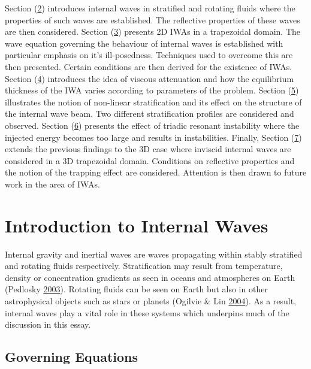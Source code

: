 \documentclass[a4paper]{article}
\numberwithin{equation}{section}
\begin{document}
Section (\hyperref[sec:2]{2}) introduces internal waves in stratified and rotating fluids where the properties of such waves are established. The reflective properties of these waves are then considered. Section (\hyperref[sec:3]{3}) presents 2D IWAs in a trapezoidal domain. The wave equation governing the behaviour of internal waves is established with particular emphasis on it's ill-posedness. Techniques used to overcome this are then presented. Certain conditions are then derived for the existence of IWAs. Section (\hyperref[sec:4]{4}) introduces the idea of viscous attenuation and how the equilibrium thickness of the IWA varies according to parameters of the problem. Section (\hyperref[sec:5]{5}) illustrates the notion of non-linear stratification and its effect on the structure of the internal wave beam. Two different stratification profiles are considered and observed. Section (\hyperref[sec:6]{6}) presents the effect of triadic resonant instability where the injected energy becomes too large and results in instabilities. Finally, Section (\hyperref[sec:7]{7}) extends the previous findings to the 3D case where inviscid internal waves are considered in a 3D trapezoidal domain. Conditions on reflective properties and the notion of the trapping effect are considered. Attention is then drawn to future work in the area of IWAs.

\newpage

\section{Introduction to Internal Waves}
\label{sec:2}
Internal gravity and inertial waves are waves propagating within stably stratified and rotating fluids respectively. Stratification may result from temperature, density or concentration gradients as seen in oceans and atmospheres on Earth (Pedlosky \hyperlink{ref 1}{2003}). Rotating fluids can be seen on Earth but also in other astrophysical objects such as stars or planets (Ogilvie \& Lin \hyperlink{ref 2}{2004}). As a result, internal waves play a vital role in these systems which underpins much of the discussion in this essay. 

\subsection{Governing Equations}
\end{document}
